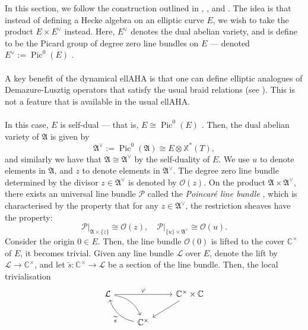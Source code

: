 \documentclass[a4paper]{report}
\theoremstyle{theorem}
\theoremstyle{definition}
\theoremstyle{remark}
\theoremstyle{proposition}
\theoremstyle{conjecture}
\theoremstyle{lemma}
\theoremstyle{corollary}
\theoremstyle{exercise}
\theoremstyle{example}
\newcommand{\C}{\mathbb{C}}
\newcommand{\mcal}{\mathcal}
\newcommand{\on}{\operatorname}
\begin{document}
  In this section, we follow the construction outlined in \cite[\S 4.3]{ZZ21}, \cite[\S 1, \S 3]{ZZ24},
  and \cite{LZZ23}.
  The idea is that instead of defining a Hecke algebra on an elliptic curve 
  $E$, we wish to take the product $E \times E^\vee$ instead. Here, 
  $E^\vee$ denotes the dual abelian variety, and is define to be the Picard
  group of degree zero line bundles on $E$ --- denoted $E^\vee := \on{Pic}^0(E)$ 
  \cite[\S 9.3]{pol09}. \\\\
  A key benefit of the dynamical ellAHA is that one can define elliptic analogues
  of Demazure-Lusztig operators that satisfy the usual braid relations (see 
  \cite[(16) and Proposition 4.11]{ZZ21}). This is not a feature that is 
  available in the usual ellAHA.\\\\
  In this case, $E$ is self-dual --- that is,
  $E \cong \on{Pic}^0(E)$ \cite[\S 9.4]{pol09}. Then, the dual abelian variety of 
  $\mathfrak{A}$ is given by 
  $$\mathfrak{A}^\vee := \on{Pic}^0(\mathfrak{A}) \cong E \otimes \mathbb{X}^\ast(T),$$
  and similarly we have that $\mathfrak{A} \cong \mathfrak{A}^\vee$ by the 
  self-duality of $E$. We use $u$ to denote elements in $\mathfrak{A}$, and 
  $z$ to denote elements in $\mathfrak{A}^\vee$. The degree zero line bundle
  determined by the divisor $z \in \mathfrak{A}^\vee$ is denoted by 
  $\mcal{O}(z)$. On the product $\mathfrak{A} \times \mathfrak{A}^\vee$, there exists an universal line bundle $\mcal{P}$ called the 
  \emph{Poincar\'e line bundle} \cite[\S 9.4]{pol09}, which is characterised by 
  the property that for any $z \in \mathfrak{A}^\vee$, the restriction sheaves
  have the property:
  $$\mcal{P}\vert_{\mathfrak{A} \times \lbrace z \rbrace} \cong \mcal{O}(z),\quad \mcal{P}\vert_{\lbrace u \rbrace \times \mathfrak{A}^\vee} \cong \mcal{O}(u).$$
  Consider the origin $0 \in E$. Then, the line bundle $\mcal{O}(0)$ is lifted to the cover 
  $\C^\times$ of $E$, it becomes trivial. Given any line bundle $\mcal{L}$ over $E$, denote the 
  lift by $\mcal{L} \to \C^\times$, and let $\widetilde{s} : \C^\times \to \mcal{L}$ be a section 
  of the line bundle. Then, the local trivialisation 
  $$\begin{tikzcd}
      \mathcal{L} \arrow[rr, "\varphi"] \arrow[rd, bend left] &                                                          & \mathbb{C}^\times \times \mathbb{C} \arrow[ld] \\
                                                              & \mathbb{C}^\times \arrow[lu, "\widetilde{s}", bend left] &                                               
  \end{tikzcd}$$
\end{document}
